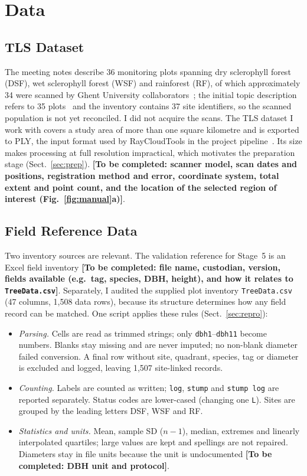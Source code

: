 \documentclass[runningheads]{llncs}
\newcommand{\todo}[1]{\textbf{[To be completed: #1]}}
\begin{document}
\section{Data}\label{sec:data}

\subsection{TLS Dataset}\label{sec:tls}
The meeting notes describe 36 monitoring plots spanning dry sclerophyll forest (DSF), wet sclerophyll forest (WSF) and rainforest (RF), of which approximately 34 were scanned by Ghent University collaborators~\cite{meetingnotes}; the initial topic description refers to 35 plots~\cite{researchtopic} and the inventory contains 37 site identifiers, so the scanned population is not yet reconciled. I did not acquire the scans. The TLS dataset I work with covers a study area of more than one square kilometre and is exported to PLY, the input format used by RayCloudTools in the project pipeline~\cite{pipeline}. Its size makes processing at full resolution impractical, which motivates the preparation stage (Sect.~\ref{sec:prep}). \todo{scanner model, scan dates and positions, registration method and error, coordinate system, total extent and point count, and the location of the selected region of interest (Fig.~\ref{fig:manual}a)}.

\subsection{Field Reference Data}\label{sec:field}
Two inventory sources are relevant. The validation reference for Stage~5 is an Excel field inventory \todo{file name, custodian, version, fields available (e.g.\ tag, species, DBH, height), and how it relates to \texttt{TreeData.csv}}. Separately, I audited the supplied plot inventory \texttt{TreeData.csv}~\cite{treedata} (47 columns, 1,508 data rows), because its structure determines how any field record can be matched. One script applies these rules (Sect.~\ref{sec:repro}):
\begin{itemize}
\item \emph{Parsing.} Cells are read as trimmed strings; only \texttt{dbh1}--\texttt{dbh11} become numbers. Blanks stay missing and are never imputed; no non-blank diameter failed conversion. A final row without site, quadrant, species, tag or diameter is excluded and logged, leaving 1,507 site-linked records.
\item \emph{Counting.} Labels are counted as written; \texttt{log}, \texttt{stump} and \texttt{stump log} are reported separately. Status codes are lower-cased (changing one \texttt{L}). Sites are grouped by the leading letters DSF, WSF and RF.
\item \emph{Statistics and units.} Mean, sample SD ($n-1$), median, extremes and linearly interpolated quartiles; large values are kept and spellings are not repaired. Diameters stay in file units because the unit is undocumented \todo{DBH unit and protocol}.
\end{itemize}
\end{document}
